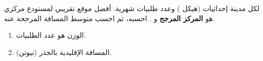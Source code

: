 \begin{statement}
لكل مدينة إحداثيات (هيكل ) وعدد طلبيات شهرية. أفضل موقع تقريبي لمستودع مركزي هو \textbf{المركز المرجح}  و . احسبه، ثم احسب متوسط المسافة المرجحة عنه.
\end{statement}
\begin{stepsbox}\begin{enumerate}
\item الوزن  هو عدد الطلبيات.
\item المسافة الإقليدية بالجذر (نيوتن).
\end{enumerate}\end{stepsbox}
